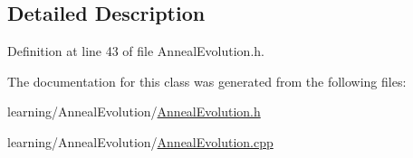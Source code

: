 \subsection{Detailed Description}


Definition at line 43 of file Anneal\-Evolution.\-h.



The documentation for this class was generated from the following files\-:\begin{DoxyCompactItemize}
\item 
learning/\-Anneal\-Evolution/\hyperlink{_anneal_evolution_8h}{Anneal\-Evolution.\-h}\item 
learning/\-Anneal\-Evolution/\hyperlink{_anneal_evolution_8cpp}{Anneal\-Evolution.\-cpp}\end{DoxyCompactItemize}
